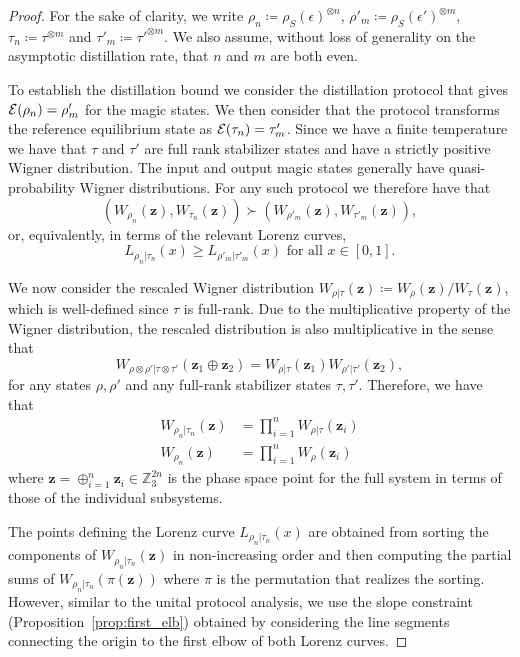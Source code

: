 \documentclass[
twocolumn,
superscriptaddress
]{revtex4-1}
\def\z{\boldsymbol{z}}
\def\E{{\cal E}}
\begin{document}
\begin{proof}
	For the sake of clarity, we write $\rho_n \coloneqq \rho_S(\epsilon)^{\otimes n}$, $\rho'_m \coloneqq \rho_S(\epsilon')^{\otimes m}$, $\tau_n \coloneqq \tau^{\otimes m}$ and $\tau'_m \coloneqq \tau'^{\otimes m}$.  We also assume, without loss of generality on the asymptotic distillation rate, that $n$ and $m$ are both even.

To establish the distillation bound we consider the distillation protocol that gives $\E( \rho_n) = \rho'_m$ for the magic states. 
We then consider that the protocol transforms the reference equilibrium state as $\E( \tau_n) = \tau'_m$.
Since we have a finite temperature we have that $\tau$ and $\tau'$ are full rank stabilizer states and have a strictly positive Wigner distribution. The input and output magic states generally have quasi-probability Wigner distributions. 
For any such protocol we therefore have that
\begin{equation}
	( W_{\rho_n}(\z), W_{\tau_n}(\z) ) \succ ( W_{\rho'_m}(\z), W_{\tau'_m}(\z) ),
\end{equation}
or, equivalently, in terms of the relevant Lorenz curves,
\begin{equation}
	L_{\rho_n |\tau_n}(x) \ge L_{\rho'_m |\tau'_m}(x) \mbox{ for all } x \in [0,1].
\end{equation}

We now consider the rescaled Wigner distribution $W_{\rho | \tau}(\z) \coloneqq W_\rho(\z)/W_\tau(\z)$, which is well-defined since $\tau$ is full-rank. 
Due to the multiplicative property of the Wigner distribution, the rescaled distribution is also multiplicative in the sense that
\begin{equation}
	W_{\rho \otimes \rho' | \tau \otimes \tau'} (\z_1 \oplus \z_2) = W_{\rho | \tau}(\z_1)W_{\rho' | \tau'}(\z_2),
\end{equation}
for any states $\rho, \rho'$ and any full-rank stabilizer states $\tau, \tau'$.
Therefore, we have that
\begin{align}
	W_{\rho_n |\tau_n} (\z) &= \prod_{i=1}^n W_{\rho|\tau}(\z_i)\\
	W_{\rho_n } (\z) &= \prod_{i=1}^n W_\rho(\z_i)
\end{align}
where $\z = \oplus_{i=1}^n \z_i \in \mathbb{Z}_3^{2n}$ is the phase space point for the full system in terms of those of the individual subsystems.

The points defining the Lorenz curve $L_{\rho_n |\tau_n}(x)$ are obtained from sorting the components of $W_{\rho_n |\tau_n}(\z)$ in non-increasing order and then computing the partial sums of $W_{\rho_n |\tau_n}(\pi(\z))$ where $\pi$ is the permutation that realizes the sorting. 
However, similar to the unital protocol analysis, we use the slope constraint (Proposition~\ref{prop:first_elb}) obtained by considering the line segments connecting the origin to the first elbow of both Lorenz curves.


\end{proof}
\end{document}
